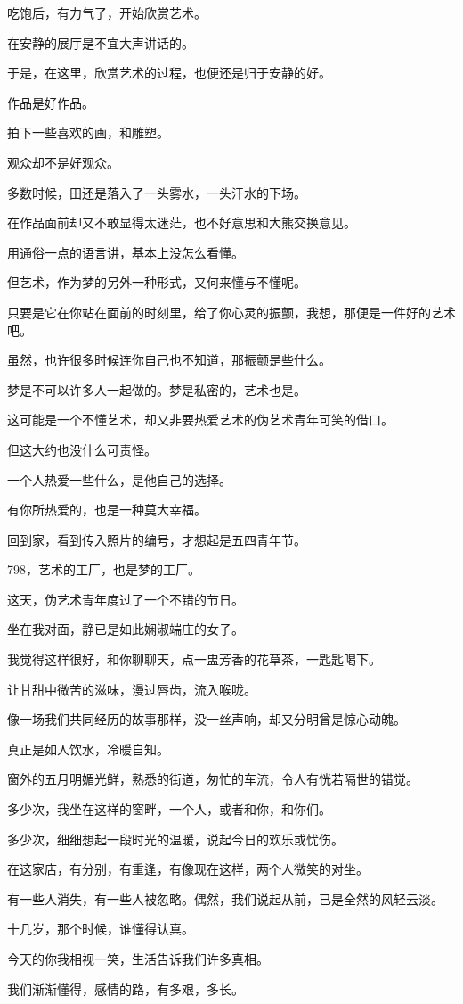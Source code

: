 		吃饱后，有力气了，开始欣赏艺术。\par
		在安静的展厅是不宜大声讲话的。\par
		于是，在这里，欣赏艺术的过程，也便还是归于安静的好。

		作品是好作品。\par
		拍下一些喜欢的画，和雕塑。

		观众却不是好观众。\par
		多数时候，田还是落入了一头雾水，一头汗水的下场。\par
		在作品面前却又不敢显得太迷茫，也不好意思和大熊交换意见。\par
		用通俗一点的语言讲，基本上没怎么看懂。\par
		但艺术，作为梦的另外一种形式，又何来懂与不懂呢。\par
		只要是它在你站在面前的时刻里，给了你心灵的振颤，我想，那便是一件好的艺术吧。\par
		虽然，也许很多时候连你自己也不知道，那振颤是些什么。\par
		梦是不可以许多人一起做的。梦是私密的，艺术也是。\par
		这可能是一个不懂艺术，却又非要热爱艺术的伪艺术青年可笑的借口。\par
		但这大约也没什么可责怪。\par
		一个人热爱一些什么，是他自己的选择。\par
		有你所热爱的，也是一种莫大幸福。

		回到家，看到传入照片的编号，才想起是五四青年节。\par
		798，艺术的工厂，也是梦的工厂。\par
		这天，伪艺术青年度过了一个不错的节日。

	\endwriting



		坐在我对面，静已是如此娴淑端庄的女子。


		我觉得这样很好，和你聊聊天，点一盅芳香的花草茶，一匙匙喝下。\par
		让甘甜中微苦的滋味，漫过唇齿，流入喉咙。\par
		像一场我们共同经历的故事那样，没一丝声响，却又分明曾是惊心动魄。\par
		真正是如人饮水，冷暖自知。

		窗外的五月明媚光鲜，熟悉的街道，匆忙的车流，令人有恍若隔世的错觉。\par
		多少次，我坐在这样的窗畔，一个人，或者和你，和你们。\par
		多少次，细细想起一段时光的温暖，说起今日的欢乐或忧伤。\par
		在这家店，有分别，有重逢，有像现在这样，两个人微笑的对坐。\par
		有一些人消失，有一些人被忽略。偶然，我们说起从前，已是全然的风轻云淡。\par
		十几岁，那个时候，谁懂得认真。\par
		今天的你我相视一笑，生活告诉我们许多真相。\par
		我们渐渐懂得，感情的路，有多艰，多长。

